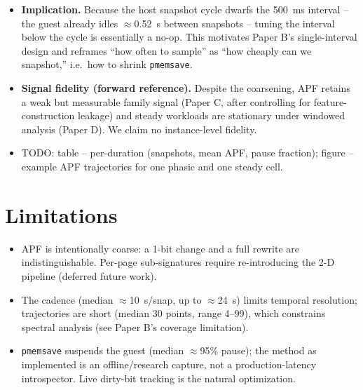 \documentclass[conference]{IEEEtran}
\begin{document}
\begin{itemize}
        median 81\% of the cycle, with suspend ($\approx$\SI{0.35}{\second}) and
        resume ($\approx$\SI{0.05}{\second}) negligible and the asynchronous
        helper read-back off the critical path. The estimated VM-pause fraction
        is high but not uniform: median 0.946 (range 0.74--0.98).
  \item \textbf{Implication.} Because the host snapshot cycle dwarfs the
        \SI{500}{\milli\second} interval -- the guest already idles
        $\approx$\SI{0.52}{\second} between snapshots -- tuning the interval
        below the cycle is essentially a no-op. This motivates Paper B's
        single-interval design and reframes ``how often to sample'' as ``how
        cheaply can we snapshot,'' i.e.\ how to shrink \texttt{pmemsave}.
  \item \textbf{Signal fidelity (forward reference).} Despite the coarsening,
        APF retains a weak but measurable family signal (Paper C, after
        controlling for feature-construction leakage) and steady workloads are
        stationary under windowed analysis (Paper D). We claim no instance-level
        fidelity.
  \item TODO: table -- per-duration (snapshots, mean APF, pause fraction);
        figure -- example APF trajectories for one phasic and one steady cell.
\end{itemize}

\section{Limitations}
\begin{itemize}
  \item APF is intentionally coarse: a 1-bit change and a full rewrite are
        indistinguishable. Per-page sub-signatures require re-introducing the
        2-D pipeline (deferred future work).
  \item The cadence (median $\approx$\SI{10}{\second}/snap, up to
        $\approx$\SI{24}{\second}) limits temporal resolution; trajectories are
        short (median 30 points, range 4--99), which constrains spectral
        analysis (see Paper B's coverage limitation).
  \item \texttt{pmemsave} suspends the guest (median $\approx$95\% pause); the
        method as implemented is an offline/research capture, not a
        production-latency introspector. Live dirty-bit tracking is the natural
        optimization.
\end{itemize}
\end{document}
